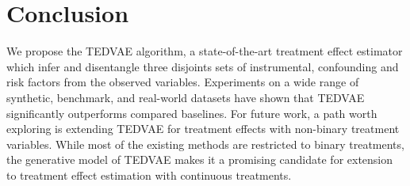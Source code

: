 \documentclass[letterpaper]{article} %
\begin{document}
\section*{Conclusion}
We propose the TEDVAE algorithm, a state-of-the-art treatment effect estimator which infer and disentangle three disjoints sets of instrumental, confounding and risk factors from the observed variables. 
Experiments on a wide range of synthetic, benchmark, and real-world datasets have shown that TEDVAE significantly outperforms compared baselines. 
For future work, a path worth exploring is extending TEDVAE for treatment effects with non-binary treatment variables. 
While most of the existing methods are restricted to binary treatments, the generative model of TEDVAE makes it a promising candidate for extension to treatment effect estimation with continuous treatments.


\end{document}
